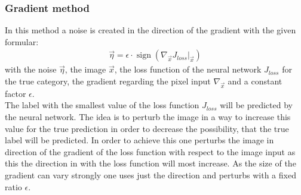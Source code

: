 \documentclass[%
 reprint,
 amsmath,amssymb,
 aps,
]{revtex4-1}
\begin{document}
\subsubsection*{Gradient method}
In this method a noise is created in the direction of the gradient with the given formular:
\begin{align*}
\vec{\eta} = \epsilon \cdot \operatorname{sign} \left( \nabla_{\vec{x}} J_{loss} \big \vert_{\vec{x}} \right)
\end{align*}
with the noise $\vec{\eta}$, the image $\vec{x}$, the loss function of the neural network $J_{loss}$ for the true category, the gradient regarding the pixel input $\nabla_{\vec{x}}$ and a constant factor $\epsilon$.\\
The label with the smallest value of the loss function $J_{loss}$ will be predicted by the neural network. The idea is to perturb the image in a way to increase this value for the true prediction in order to decrease the possibility, that the true label will be predicted. In order to achieve this one perturbs the image in direction of the gradient of the loss function with respect to the image input as this the direction in with the loss function will most increase. As the size of the gradient can vary strongly one uses just the direction and perturbs with a fixed ratio $\epsilon$. \cite{paperGrad}
\end{document}
